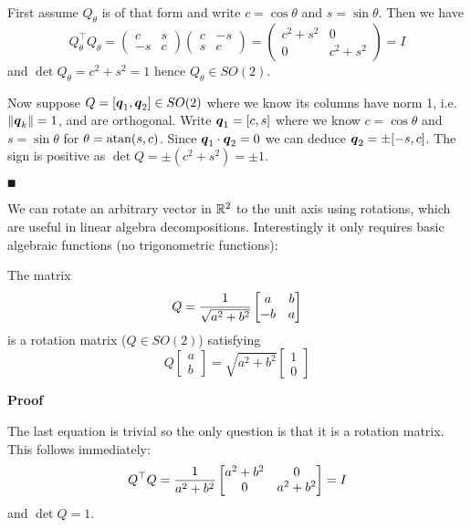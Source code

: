 First assume $Q_\ensuremath{\theta}$ is of that form and write $c = \cos \ensuremath{\theta}$ and $s = \sin \ensuremath{\theta}$. Then we have
\[
Q_\ensuremath{\theta}^\ensuremath{\top}Q_\ensuremath{\theta} = \begin{pmatrix} c & s \\ -s & c \end{pmatrix} \begin{pmatrix} c & -s \\ s & c \end{pmatrix} = 
\begin{pmatrix} c^2 + s^2 & 0 \\ 0 & c^2 + s^2 \end{pmatrix} = I
\]
and $\det Q_\ensuremath{\theta} = c^2 + s^2 = 1$ hence $Q_\ensuremath{\theta} \ensuremath{\in} SO(2)$. 

Now suppose $Q = [\bm{{\mbox{\boldmath$q$\unboldmath}}}_1, \bm{{\mbox{\boldmath$q$\unboldmath}}}_2] \in SO(2)$ where we know its columns have norm 1, i.e. $\|\bm{{\mbox{\boldmath$q$\unboldmath}}}_k\| = 1$, and are orthogonal. Write $\bm{{\mbox{\boldmath$q$\unboldmath}}}_1 = [c,s]$ where we know $c = \cos \ensuremath{\theta}$ and $s = \sin \ensuremath{\theta}$ for $\ensuremath{\theta} = {\rm atan}(s, c)$.  Since $\bm{{\mbox{\boldmath$q$\unboldmath}}}_1\cdot \bm{{\mbox{\boldmath$q$\unboldmath}}}_2 = 0$ we can deduce $\bm{{\mbox{\boldmath$q$\unboldmath}}}_2 = \pm [-s,c]$. The sign is positive as $\det Q = \ensuremath{\pm}(c^2 + s^2) = \ensuremath{\pm}1$.

\ensuremath{\QED}

We can rotate an arbitrary vector in ${\mathbb R}^2$ to the unit axis using rotations, which are useful in linear algebra decompositions. Interestingly it only requires basic algebraic functions (no trigonometric functions):

\begin{proposition}  The matrix
\[
Q = {1 \over \sqrt{a^2 + b^2}}
\begin{bmatrix}
 a & b \cr -b & a
\end{bmatrix}
\]
is a rotation matrix ($Q \ensuremath{\in} SO(2)$) satisfying
\[
Q \begin{bmatrix} a \\ b \end{bmatrix} = \sqrt{a^2 + b^2} \begin{bmatrix} 1 \\ 0 \end{bmatrix}
\]
\end{proposition}
\textbf{Proof} 

The last equation is trivial so the only question is that it is a rotation matrix. This follows immediately:
\[
Q^\ensuremath{\top} Q = {1 \over a^2 + b^2}  \begin{bmatrix}
 a^2 + b^2 & 0 \cr 0 & a^2 + b^2
\end{bmatrix} = I
\]
and $\det Q = 1$.

